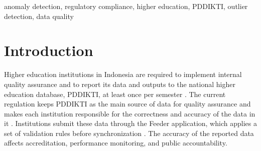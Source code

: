 \documentclass[conference]{IEEEtran}
\begin{document}
\begin{abstract}
Higher education institutions in Indonesia report their academic data to the national database PDDIKTI, and records that violate reporting rules weaken quality assurance and accreditation. This paper studies the detection of compliance anomalies in PDDIKTI data alone, without any institutional source system. Explicit validation rules taken from the Feeder PDDIKTI user guide are combined with three unsupervised outlier detectors: Isolation Forest, Local Outlier Factor, and an autoencoder. The data come from one institution with three study programs and cover 15 semesters, including 3,948 student-semester records, 348 courses, and 1,636 lecturer teaching activities. Because the data already satisfy the Feeder validation, anomalies are injected into a copy of the data, and detection is evaluated over 10 random injections. Rules detect explicit violations exactly but miss records that satisfy every threshold. The outlier detectors recover part of these records, and their performance depends on the entity: for teaching activities, Isolation Forest and Local Outlier Factor recover about two thirds of them, while for student-semester records the best detector recovers 39 percent. A combined detector reaches an area under the ROC curve of 0.982 for student-semester records. The results indicate that rule-based and machine learning detection are complementary for compliance checking of academic data.
\end{abstract}

\begin{IEEEkeywords}
\raggedright
anomaly detection, regulatory compliance, higher education, PDDIKTI, outlier detection, data quality
\end{IEEEkeywords}

\section{Introduction}
Higher education institutions in Indonesia are required to implement internal quality assurance and to report its data and outputs to the national higher education database, PDDIKTI, at least once per semester \cite{permendikbudristek53_2023}. The current regulation keeps PDDIKTI as the main source of data for quality assurance and makes each institution responsible for the correctness and accuracy of the data in it \cite{permendiktisaintek39_2025}. Institutions submit these data through the Feeder application, which applies a set of validation rules before synchronization \cite{feeder_guide}. The accuracy of the reported data affects accreditation, performance monitoring, and public accountability.
\end{document}
